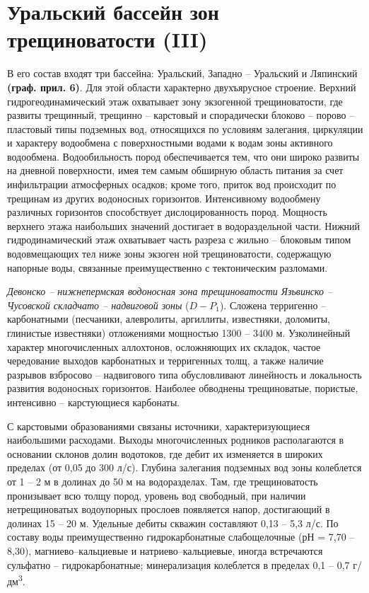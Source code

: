\section*{Уральский бассейн зон трещиноватости (III)}

В его состав входят три бассейна: Уральский, Западно -- Уральский и Ляпинский \textbf{(граф. прил. 6)}. Для этой области характерно двухъярусное строение. Верхний гидрогеодинамический этаж охватывает зону экзогенной трещиноватости, где развиты трещинный, трещинно -- карстовый и спорадически
блоково -- порово -- пластовый типы подземных вод, относящихся по условиям залегания, циркуляции и характеру водообмена с поверхностными водами к
водам зоны активного водообмена. Водообильность пород обеспечивается тем, что они широко развиты на дневной поверхности, имея тем самым обширную область питания за счет инфильтрации атмосферных осадков; кроме того, приток вод происходит по трещинам из других водоносных горизонтов.
Интенсивному водообмену различных горизонтов способствует дислоцированность пород. Мощность верхнего этажа наибольших значений достигает в
водораздельной части. Нижний гидродинамический этаж охватывает часть разреза с жильно -- блоковым типом водовмещающих тел ниже зоны экзоген
ной трещиноватости, содержащую напорные воды, связанные преимущественно с тектоническим разломами.

\textit{Девонско -- нижнепермская водоносная зона трещиноватости Язьвинско -- Чусовской складчато -- надвиговой зоны} ($D - P_1$). Сложена терригенно -- 
карбонатными (песчаники, алевролиты, аргиллиты, известняки, доломиты, глинистые известняки) отложениями мощностью 1300 -- 3400 м.
Узколинейный характер многочисленных аллохтонов, осложняющих их складок, частое чередование выходов карбонатных и терригенных толщ,
а также наличие разрывов взбросово -- надвигового типа обусловливают линейность и локальность развития водоносных горизонтов. Наиболее обводнены трещиноватые, пористые, интенсивно -- карстующиеся карбонаты. 

С карстовыми образованиями связаны источники, характеризующиеся наибольшими расходами. Выходы многочисленных родников располагаются
в основании склонов долин водотоков, где дебит их изменяется в широких пределах (от 0,05 до 300 л/с).
Глубина залегания подземных вод зоны колеблется от 1 -- 2 м в долинах до 50 м на водоразделах. Там, где трещиноватость пронизывает всю толщу пород, уровень вод свободный, при наличии нетрещиноватых водоупорных прослоев появляется напор, достигающий в долинах 15 -- 20 м. Удельные дебиты скважин составляют 0,13 -- 5,3 л/с.
По составу воды преимущественно гидрокарбонатные слабощелочные (рН = 7,70 -- 8,30), магниево--кальциевые и натриево--кальциевые, иногда встречаются сульфатно -- гидрокарбонатные; минерализация колеблется в пределах 0,1 -- 0,7 г/дм\textsuperscript{3}.

